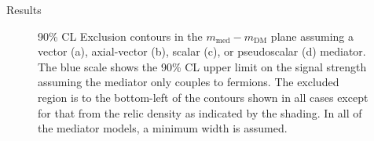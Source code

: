 \begin{section}{Results}
\begin{figure}[htbp]
{	\label{fig:mass_805}
  }
  \caption{90\% CL Exclusion contours in the $m_{\textrm{med}}-m_{\textrm{DM}}$ plane assuming a vector (a), axial-vector (b), scalar (c), or pseudoscalar (d) mediator. 
The blue scale shows the 90\% CL upper limit on the signal strength assuming the mediator only couples to fermions. 
The excluded region is to the bottom-left of the contours shown in all cases except for that from the relic density as indicated by the shading.
In all of the mediator models, a minimum width is assumed\label{fig:masslims}.}
\end{figure}



 

\end{section}

